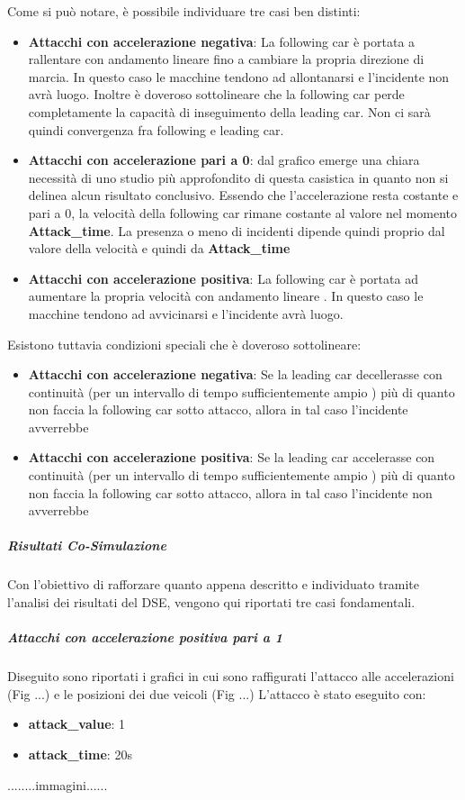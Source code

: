 Come si può notare, è possibile individuare tre casi ben distinti:
\begin{itemize}
	\item \textbf{Attacchi con accelerazione negativa}: La following car è portata a rallentare con andamento lineare fino a cambiare la propria direzione di marcia. In questo caso le macchine tendono ad allontanarsi e l'incidente non avrà luogo. Inoltre è doveroso sottolineare che la following car perde completamente la capacità di inseguimento della leading car. Non ci sarà quindi convergenza fra following e leading car.
	\item \textbf{Attacchi con accelerazione pari a 0}: dal grafico emerge una chiara necessità di uno studio più approfondito di questa casistica in quanto non si delinea alcun risultato conclusivo. Essendo che l'accelerazione resta costante e pari a 0, la velocità della following car rimane costante al valore nel momento \textbf{Attack\_time}. La presenza o meno di incidenti dipende quindi proprio dal valore della velocità e quindi da \textbf{Attack\_time}
	\item \textbf{Attacchi con accelerazione positiva}: La following car è portata ad aumentare la propria velocità con andamento lineare . In questo caso le macchine tendono ad avvicinarsi e l'incidente avrà luogo.
\end{itemize}
Esistono tuttavia condizioni speciali che è doveroso sottolineare:
\begin{itemize}
	\item \textbf{Attacchi con accelerazione negativa}: Se la leading car decellerasse con continuità (per un intervallo di tempo sufficientemente ampio ) più di quanto non faccia la following car sotto attacco, allora in tal caso l'incidente avverrebbe
	\item \textbf{Attacchi con accelerazione positiva}: Se la leading car accelerasse con continuità (per un intervallo di tempo sufficientemente ampio ) più di quanto non faccia la following car sotto attacco, allora in tal caso l'incidente non avverrebbe
\end{itemize}
\subparagraph{Risultati Co-Simulazione}
Con l'obiettivo di rafforzare quanto appena descritto  e individuato tramite l'analisi dei risultati del DSE, vengono qui riportati tre casi fondamentali.
\subparagraph{Attacchi con accelerazione positiva pari a 1} Diseguito sono riportati i grafici in cui sono raffigurati l'attacco alle accelerazioni (Fig ...) e le posizioni dei due veicoli (Fig ...)
L'attacco è stato eseguito con:
\begin{itemize}
	\item \textbf{attack\_value}: 1
	\item \textbf{attack\_time}: 20s
\end{itemize}
........immagini......

